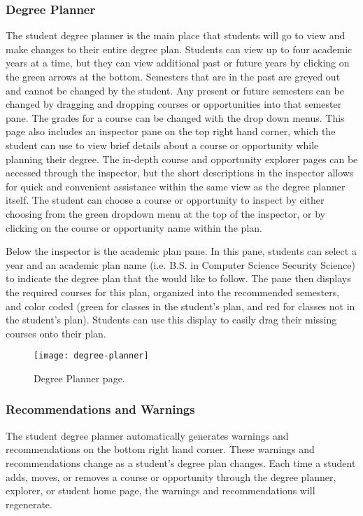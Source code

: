 \subsubsection{Degree Planner}
The student degree planner is the main place that students will go to view and make changes to their entire degree plan. Students can view up to four academic years at a time, but they can view additional past or future years by clicking on the green arrows at the bottom. Semesters that are in the past are greyed out and cannot be changed by the student. Any present or future semesters can be changed by dragging and dropping courses or opportunities into that semester pane. The grades for a course can be changed with the drop down menus. This page also includes an inspector pane on the top right hand corner, which the student can use to view brief details about a course or opportunity while planning their degree. The in-depth course and opportunity explorer pages can be accessed through the inspector, but the short descriptions in the inspector allows for quick and convenient assistance within the same view as the degree planner itself. The student can choose a course or opportunity to inspect by either choosing from the green dropdown menu at the top of the inspector, or by clicking on the course or opportunity name within the plan. 

Below the inspector is the academic plan pane. In this pane, students can select a year and an academic plan name (i.e. B.S. in Computer Science Security Science) to indicate the degree plan that the would like to follow. The pane then displays the required courses for this plan, organized into the recommended semesters, and color coded (green for classes in the student's plan, and red for classes not in the student's plan). Students can use this display to easily drag their missing courses onto their plan.

\begin{figure}[h]
\centering
\texttt{[image: degree-planner]}
\caption{Degree Planner page.}
\end{figure}

\subsubsection{Recommendations and Warnings}
The student degree planner automatically generates warnings and recommendations on the bottom right hand corner. These warnings and recommendations change as a student's degree plan changes. Each time a student adds, moves, or removes a course or opportunity through the degree planner, explorer, or student home page, the warnings and recommendations will regenerate. 


